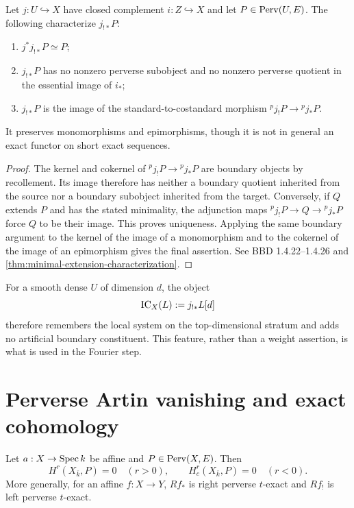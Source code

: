 \begin{proposition}
\label{prop:jmiddle-engine}
Let \(j:U\hookrightarrow X\) have closed complement \(i:Z\hookrightarrow X\)
and let \(P\in\operatorname{Perv}(U,E)\).  The following characterize \(j_{!*}P\):
\begin{enumerate}
\item \(j^*j_{!*}P\simeq P\);
\item \(j_{!*}P\) has no nonzero perverse subobject and no nonzero perverse
      quotient in the essential image of \(i_*\);
\item \(j_{!*}P\) is the image of the standard-to-costandard morphism
      \({}^pj_!P\to{}^pj_*P\).
\end{enumerate}
It preserves monomorphisms and epimorphisms, though it is not in general an
exact functor on short exact sequences.
\end{proposition}

\begin{proof}
The kernel and cokernel of
\({}^pj_!P\to{}^pj_*P\) are boundary objects by recollement.  Its image
therefore has neither a boundary quotient inherited from the source nor a
boundary subobject inherited from the target.  Conversely, if \(Q\) extends
\(P\) and has the stated minimality, the adjunction maps
\({}^pj_!P\to Q\to{}^pj_*P\) force \(Q\) to be their image.  This proves
uniqueness.  Applying the same boundary argument to the kernel of the image
of a monomorphism and to the cokernel of the image of an epimorphism gives
the final assertion.  See BBD 1.4.22--1.4.26 and
\cref{thm:minimal-extension-characterization}.
\end{proof}

For a smooth dense \(U\) of dimension \(d\), the object
\[
  \operatorname{IC}_X(L):=j_{!*}L[d]
\]
therefore remembers the local system on the top-dimensional stratum and
adds no artificial boundary constituent.  This feature, rather than a
weight assertion, is what is used in the Fourier step.

\section{Perverse Artin vanishing and exact cohomology}

\begin{theorem}
\label{thm:perverse-artin-engine}
Let \(a:X\to\operatorname{Spec} k\) be affine and \(P\in\operatorname{Perv}(X,E)\).  Then
\[
  H^r(X_{\bar k},P)=0\quad(r>0),\qquad
  H_c^r(X_{\bar k},P)=0\quad(r<0).
\tag{\thechapter.1}\label{eq:artin-engine-vanishing}
\]
More generally, for an affine \(f:X\to Y\), \(Rf_*\) is right perverse
\(t\)-exact and \(Rf_!\) is left perverse \(t\)-exact.
\end{theorem}

